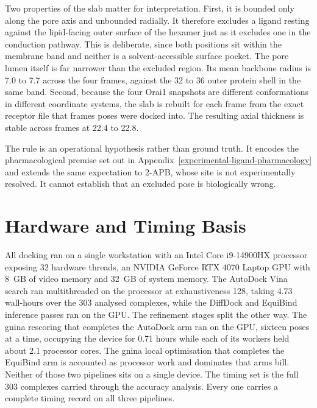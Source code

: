 Two properties of the slab matter for interpretation. First, it is bounded only along the pore axis and unbounded radially. It therefore excludes a ligand resting against the lipid-facing outer surface of the hexamer just as it excludes one in the conduction pathway. This is deliberate, since both positions sit within the membrane band and neither is a solvent-accessible surface pocket. The pore lumen itself is far narrower than the excluded region. Its mean backbone radius is 7.0 to 7.7\angstrom{} across the four frames, against the 32 to 36\angstrom{} outer protein shell in the same band. Second, because the four Orai1 snapshots are different conformations in different coordinate systems, the slab is rebuilt for each frame from the exact receptor file that frame\textquotesingle s poses were docked into. The resulting axial thickness is stable across frames at 22.4 to 22.8\angstrom{}.

The rule is an operational hypothesis rather than ground truth. It encodes the pharmacological premise set out in Appendix~\ref{experimental-ligand-pharmacology} and extends the same expectation to 2-APB, whose site is not experimentally resolved. It cannot establish that an excluded pose is biologically wrong.

\hypertarget{hardware-and-timing-basis}{%
\section{Hardware and Timing Basis}\label{hardware-and-timing-basis}}

All docking ran on a single workstation with an Intel Core i9-14900HX processor exposing 32 hardware threads, an NVIDIA GeForce RTX 4070 Laptop GPU with 8~GB of video memory and 32~GB of system memory. The AutoDock Vina search ran multithreaded on the processor at exhaustiveness 128, taking 4.73 wall-hours over the 303 analysed complexes, while the DiffDock and EquiBind inference passes ran on the GPU. The refinement stages split the other way. The gnina rescoring that completes the AutoDock arm ran on the GPU, sixteen poses at a time, occupying the device for 0.71 hours while each of its workers held about 2.1 processor cores. The gnina local optimisation that completes the EquiBind arm is accounted as processor work and dominates that arm\textquotesingle{}s bill. Neither of those two pipelines sits on a single device. The timing set is the full 303 complexes carried through the accuracy analysis. Every one carries a complete timing record on all three pipelines.

